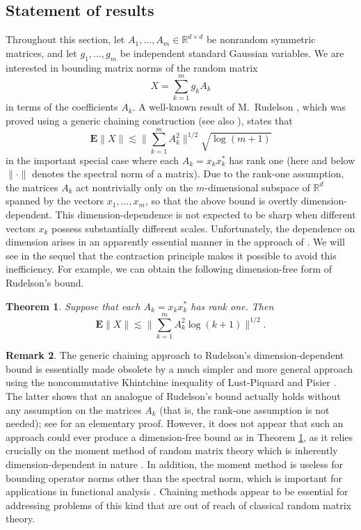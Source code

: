 \documentclass[10pt,reqno]{amsart}
\newtheorem{thm}{Theorem}[section]
\theoremstyle{definition}
\newtheorem{rem}[thm]{Remark}
\numberwithin{equation}{section}
\numberwithin{figure}{section}
\numberwithin{table}{section}
\begin{document}
\subsection{Statement of results}

Throughout this section, let $A_1,\ldots,A_m\in\mathbb{R}^{d\times d}$ be 
nonrandom symmetric matrices, and let $g_1,\ldots,g_m$ be independent 
standard Gaussian variables. We are interested in bounding matrix norms of 
the random matrix
$$
	X = \sum_{k=1}^m g_kA_k
$$
in terms of the coefficients $A_k$. A well-known result of M.\ 
Rudelson \cite{Rud96}, which was proved using a generic chaining 
construction (see also \cite[section 16.7]{Tal14}), states that
$$
	\mathbf{E}\|X\|\lesssim 
	\Bigg\|\sum_{k=1}^m A_k^2\Bigg\|^{1/2}\sqrt{\log(m+1)}
$$
in the important special case where each $A_k=x_kx_k^*$ has rank one (here 
and below $\|\cdot\|$ denotes the spectral norm of a matrix). Due to the 
rank-one assumption, the matrices $A_k$ act nontrivially only on the 
$m$-dimensional subspace of $\mathbb{R}^d$ spanned by the vectors 
$x_1,\ldots,x_m$, so that the above bound is overtly dimension-dependent.
This dimension-dependence is not expected to be sharp when different 
vectors $x_k$ possess substantially different scales. Unfortunately, the 
dependence on dimension arises in an apparently essential manner 
in the approach of \cite{Rud96}. We will see in the sequel that the 
contraction principle makes it possible to avoid this inefficiency.
For example, we can obtain the following dimension-free form of 
Rudelson's bound.

\begin{thm}
\label{thm:dimfreerud}
Suppose that each $A_k=x_kx_k^*$ has rank one. Then
$$
	\mathbf{E}\|X\|\lesssim
	\Bigg\|\sum_{k=1}^m A_k^2\log(k+1)\Bigg\|^{1/2}.
$$
\end{thm}

\begin{rem}
\label{rem:khin}
The generic chaining approach to Rudelson's dimension-dependent bound is 
essentially made obsolete by a much simpler and more general approach 
using the noncommutative Khintchine inequality of Lust-Piquard and Pisier 
\cite{Rud99}. The latter shows that an analogue of Rudelson's bound 
actually holds without any assumption on the matrices $A_k$ (that is, the 
rank-one assumption is not needed); see \cite{vH17} for an 
elementary proof. However, it does not appear that such an approach could 
ever produce a dimension-free bound as in Theorem \ref{thm:dimfreerud}, as 
it relies crucially on the moment method of random matrix theory which is 
inherently dimension-dependent in nature \cite{vH16b}. In addition, the 
moment method is useless for bounding operator norms other than the 
spectral norm, which is important for applications in functional analysis
\cite{GR07,GMPT08,RV08}. Chaining methods appear to be essential for 
addressing problems of this kind that are out of reach of classical random 
matrix theory.
\end{rem}
\end{document}
